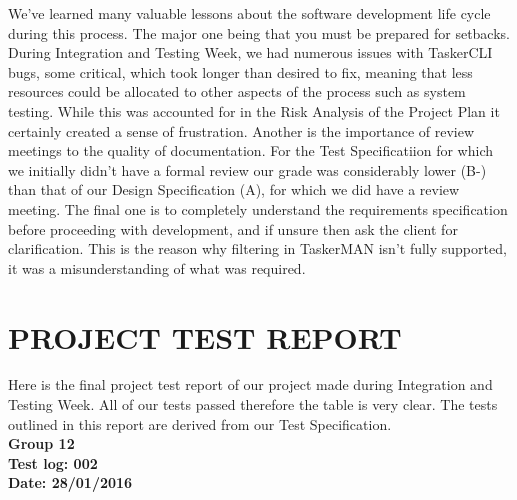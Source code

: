 \documentclass{project}
\begin{document}
We've learned many valuable lessons about the software development life cycle during this process. The major one being that you must be prepared for setbacks. During Integration and Testing Week, we had numerous issues with TaskerCLI bugs, some critical, which took longer than desired to fix, meaning that less resources could be allocated to other aspects of the process such as system testing. While this was accounted for in the Risk Analysis of the Project Plan\cite{se.qa.pp} it certainly created a sense of frustration. Another is the importance of review meetings to the quality of documentation. For the Test Specificatiion for which we initially didn't have a formal review our grade was considerably lower (B-) than that of our Design Specification (A), for which we did have a review meeting. The final one is to completely understand the requirements specification before proceeding with development, and if unsure then ask the client for clarification. This is the reason why filtering in TaskerMAN isn't fully supported, it was a misunderstanding of what was required.
\clearpage

\section{PROJECT TEST REPORT}
Here is the final project test report of our project made during Integration and Testing Week. All of our tests passed therefore the table is very clear. The tests outlined in this report are derived from our Test Specification\cite{se.qa.ts}. \\

\textbf{Group 12} \\
\textbf{Test log: 002} \\
\textbf{Date: 28/01/2016} \\
\end{document}
